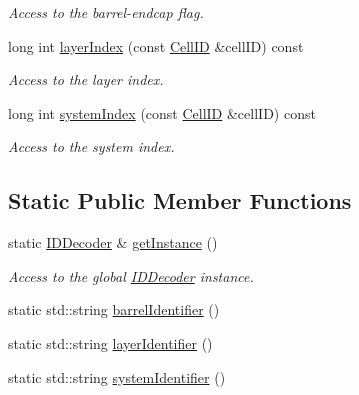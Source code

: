 \begin{DoxyCompactItemize}
\begin{DoxyCompactList}\small\item\em Access to the barrel-\/endcap flag. \item\end{DoxyCompactList}\item 
long int \hyperlink{class_d_d4hep_1_1_d_d_rec_1_1_i_d_decoder_a97d36fafaecff5fd10580d86bbafd510}{layerIndex} (const \hyperlink{namespace_d_d4hep_1_1_d_d_rec_af5cecc2e566eeaedb430b92df23971d4}{CellID} \&cellID) const 
\begin{DoxyCompactList}\small\item\em Access to the layer index. \item\end{DoxyCompactList}\item 
long int \hyperlink{class_d_d4hep_1_1_d_d_rec_1_1_i_d_decoder_a6841753c1a36c89967c93b6fc9ffc8ee}{systemIndex} (const \hyperlink{namespace_d_d4hep_1_1_d_d_rec_af5cecc2e566eeaedb430b92df23971d4}{CellID} \&cellID) const 
\begin{DoxyCompactList}\small\item\em Access to the system index. \item\end{DoxyCompactList}\end{DoxyCompactItemize}
\subsection*{Static Public Member Functions}
\begin{DoxyCompactItemize}
\item 
static \hyperlink{class_d_d4hep_1_1_d_d_rec_1_1_i_d_decoder}{IDDecoder} \& \hyperlink{class_d_d4hep_1_1_d_d_rec_1_1_i_d_decoder_a9a7ec8c15a97dad8bdbc0743bb534c3f}{getInstance} ()
\begin{DoxyCompactList}\small\item\em Access to the global \hyperlink{class_d_d4hep_1_1_d_d_rec_1_1_i_d_decoder}{IDDecoder} instance. \item\end{DoxyCompactList}\item 
static std::string \hyperlink{class_d_d4hep_1_1_d_d_rec_1_1_i_d_decoder_ac5bd93061aef3850d7aca8711e8a507f}{barrelIdentifier} ()
\item 
static std::string \hyperlink{class_d_d4hep_1_1_d_d_rec_1_1_i_d_decoder_a0eb172032d0261f4d8897f705ed94cee}{layerIdentifier} ()
\item 
static std::string \hyperlink{class_d_d4hep_1_1_d_d_rec_1_1_i_d_decoder_a11948929195ead4902e59730ad4a582f}{systemIdentifier} ()
\end{DoxyCompactItemize}
